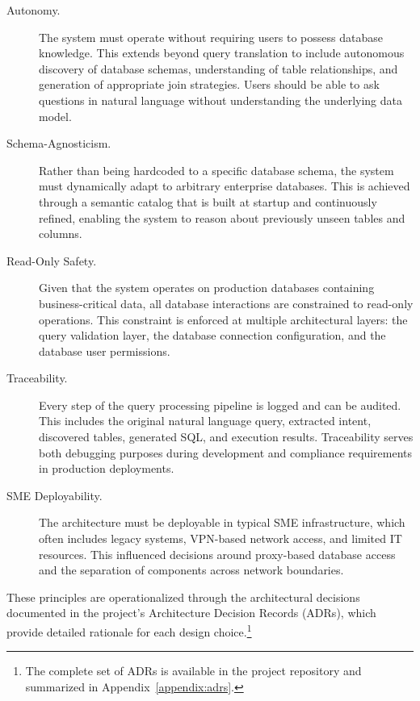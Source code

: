 \begin{description}
    \item[Autonomy.] The system must operate without requiring users to possess database knowledge. This extends beyond query translation to include autonomous discovery of database schemas, understanding of table relationships, and generation of appropriate join strategies. Users should be able to ask questions in natural language without understanding the underlying data model.

    \item[Schema-Agnosticism.] Rather than being hardcoded to a specific database schema, the system must dynamically adapt to arbitrary enterprise databases. This is achieved through a semantic catalog that is built at startup and continuously refined, enabling the system to reason about previously unseen tables and columns.

    \item[Read-Only Safety.] Given that the system operates on production databases containing business-critical data, all database interactions are constrained to read-only operations. This constraint is enforced at multiple architectural layers: the query validation layer, the database connection configuration, and the database user permissions.

    \item[Traceability.] Every step of the query processing pipeline is logged and can be audited. This includes the original natural language query, extracted intent, discovered tables, generated SQL, and execution results. Traceability serves both debugging purposes during development and compliance requirements in production deployments.

    \item[SME Deployability.] The architecture must be deployable in typical SME infrastructure, which often includes legacy systems, VPN-based network access, and limited IT resources. This influenced decisions around proxy-based database access and the separation of components across network boundaries.
\end{description}

These principles are operationalized through the architectural decisions documented in the project's Architecture Decision Records (ADRs), which provide detailed rationale for each design choice.\footnote{The complete set of ADRs is available in the project repository and summarized in Appendix~\ref{appendix:adrs}.}

